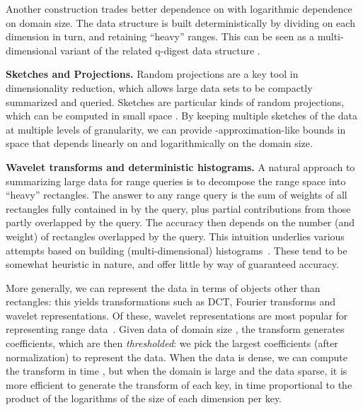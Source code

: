 \documentclass[11pt]{article}
\begin{document}
Another construction \cite{HSST:ISAAC04}
trades better dependence on  with logarithmic dependence on
domain size.
The data structure is built deterministically by dividing on each
dimension in turn, and retaining ``heavy'' ranges. 
This can be seen as a multi-dimensional variant of the related
q-digest data structure \cite{ShrivastavaBAS:sensys04}.





\smallskip
\noindent
{\bf Sketches and Projections.}
Random projections are a key tool in dimensionality reduction, which
allows large data sets to be compactly summarized and queried. 
Sketches are particular kinds of random projections, which can be
computed in small space \cite{ccf:icalp2002}.
By keeping multiple sketches of the data at multiple levels of
granularity, we can provide -approximation-like bounds in
space that depends linearly on  and logarithmically on
the domain size.   

\smallskip
\noindent
{\bf Wavelet transforms and deterministic histograms.}
A natural approach to summarizing large data for range queries is to
decompose the range space into ``heavy'' rectangles. 
The answer to any range query is the sum of weights of all rectangles
fully contained in by the query, plus partial contributions from those
partly overlapped by the query. 
The accuracy then depends on the number (and weight) of rectangles
overlapped by the query. 
This intuition underlies various attempts based on building 
 (multi-dimensional)
histograms~\cite{GKTD:sigmod2000,PoosalaIoannidis:VLDB97,LKC:sigmod1999}.
These tend to be somewhat heuristic in nature, and offer little by way
of guaranteed accuracy.

More generally, we can represent the data in terms of objects other
than rectangles: this yields transformations such as 
DCT, Fourier transforms and wavelet representations. 
Of these, wavelet representations are most popular for representing
range data~\cite{Matias98wavelet-basedhistograms,Vitter98datacube}.
Given data of domain size , the transform generates 
coefficients, which are then {\em thresholded}: we pick the 
largest coefficients (after normalization) to represent the data. 
When the data is dense, we can compute the transform in time ,
but when the domain is large and the data sparse, it is more efficient
to generate the transform of each key, in time proportional to the
product of the logarithms of the size of each dimension per key. 
\end{document}
